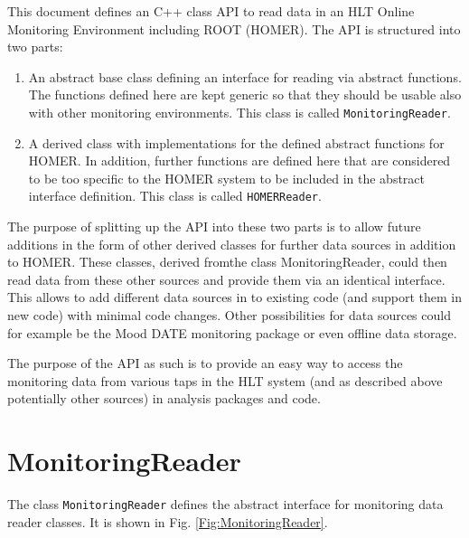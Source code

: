 \documentclass[a4paper,twoside]{article}
\begin{document}
This document defines an C++ class API to read data in an HLT Online Monitoring Environment including ROOT (HOMER). The API is structured into two parts:
\begin{enumerate}
\item An abstract base class defining an interface for reading via abstract functions. The functions defined here are kept generic so that they should be usable also with other monitoring environments. This class is called \texttt{Moni\-tor\-ing\-Read\-er}.
\item A derived class with implementations for the defined abstract functions for HOMER. In addition, further functions are defined here that are considered to be too specific to the HOMER system to be included in the abstract interface definition. This class is called \texttt{HOMER\-Read\-er}.
\end{enumerate}
The purpose of splitting up the API into these two parts is to allow future additions in the form of other derived classes for further data sources in addition to HOMER. These classes, derived fromthe class MonitoringReader, could then read data from these other sources and provide them via an identical interface. This allows to add different data sources in to existing code (and support them in new code) with minimal code changes. Other possibilities for data sources could for example be the Mood DATE monitoring package or even offline data storage. 

The purpose of the API as such is to provide an easy way to access the monitoring data from various taps in the HLT system (and as described above potentially other sources) in analysis packages and code.

\section{MonitoringReader}

The class \texttt{MonitoringReader} defines the abstract interface for monitoring data reader classes. It is shown in Fig. \ref{Fig:MonitoringReader}. 
\end{document}
